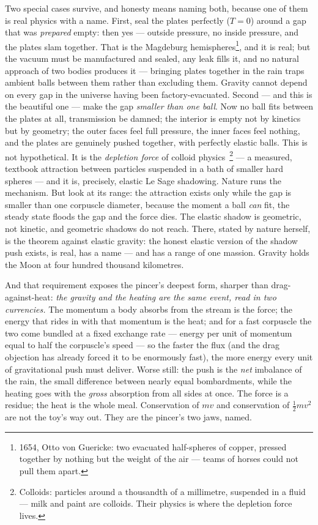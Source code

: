 \documentclass[fontsize=11pt,paper=a4,pagesize=auto,parskip=half-]{scrbook}
\newcommand{\Ixtmp}{}
\DeclareRobustCommand{\Ix}[1]{%
  #1%
  \begingroup
    \lowercase{\gdef\Ixtmp{#1}}%
    \expandafter\index\expandafter{\Ixtmp}%
  \endgroup}
\begin{document}
Two special cases survive, and honesty means naming both, because one of them is real physics with a name. First, seal the plates perfectly ($T=0$) around a gap that was \emph{prepared} empty: then yes --- outside pressure, no inside pressure, and the plates slam together. That is the Magdeburg hemispheres\footnote{1654, Otto von Guericke: two evacuated half-spheres of copper, pressed together by nothing but the weight of the air --- teams of horses could not pull them apart.}, and it is real; but the vacuum must be manufactured and sealed, any leak fills it, and no natural approach of two bodies produces it --- bringing plates together in the rain traps ambient balls between them rather than excluding them. Gravity cannot depend on every gap in the universe having been factory-evacuated. Second --- and this is the beautiful one --- make the gap \emph{smaller than one ball}. Now no ball fits between the plates at all, transmission be damned; the interior is empty not by kinetics but by geometry; the outer faces feel full pressure, the inner faces feel nothing, and the plates are genuinely pushed together, with perfectly elastic balls. This is not hypothetical. It is the \emph{\Ix{depletion force}} of colloid physics~\cite{asakuraoosawa1954}\footnote{Colloids: particles around a thousandth of a millimetre, suspended in a fluid --- milk and paint are colloids. Their physics is where the depletion force lives.} --- a measured, textbook attraction between particles suspended in a bath of smaller hard spheres --- and it is, precisely, elastic Le Sage shadowing. Nature runs the mechanism. But look at its range: the attraction exists only while the gap is smaller than one corpuscle diameter, because the moment a ball \emph{can} fit, the steady state floods the gap and the force dies. The elastic shadow is geometric, not kinetic, and geometric shadows do not reach. There, stated by nature herself, is the theorem against elastic gravity: the honest elastic version of the shadow push exists, is real, has a name --- and has a range of one massion. Gravity holds the Moon at four hundred thousand kilometres.

And that requirement exposes the pincer's deepest form, sharper than drag-against-heat: \emph{the gravity and the heating are the same event, read in two currencies.} The momentum a body absorbs from the stream is the force; the energy that rides in with that momentum is the heat; and for a fast corpuscle the two come bundled at a fixed exchange rate --- energy per unit of momentum equal to half the corpuscle's speed --- so the faster the flux (and the drag objection has already forced it to be enormously fast), the more energy every unit of gravitational push must deliver. Worse still: the push is the \emph{net} imbalance of the rain, the small difference between nearly equal bombardments, while the heating goes with the \emph{gross} absorption from all sides at once. The force is a residue; the heat is the whole meal. Conservation of $mv$ and conservation of $\tfrac{1}{2}mv^{2}$ are not the toy's way out. They are the pincer's two jaws, named.
\end{document}
